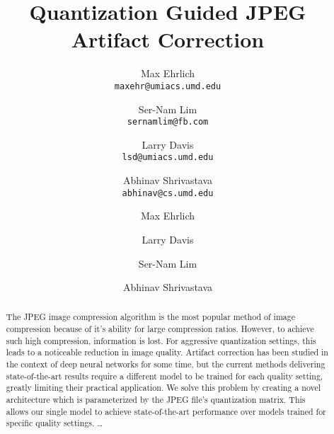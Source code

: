 \documentclass[runningheads]{llncs}
\begin{document}
\pagestyle{headings}
\mainmatter
\def\ECCVSubNumber{570}  

\title{Quantization Guided JPEG Artifact Correction}

\author{Max Ehrlich \\ \texttt{maxehr@umiacs.umd.edu} \and
    Ser-Nam Lim \\ \texttt{sernamlim@fb.com} \and
    Larry Davis \\ \texttt{lsd@umiacs.umd.edu} \and
    Abhinav Shrivastava \\ \texttt{abhinav@cs.umd.edu} 
}


\begin{comment}
\titlerunning{ECCV-20 submission ID \ECCVSubNumber} 
\authorrunning{ECCV-20 submission ID \ECCVSubNumber} 
\author{Anonymous ECCV submission}
\institute{Paper ID \ECCVSubNumber}
\end{comment}


\author{Max Ehrlich \and
Larry Davis \and
Ser-Nam Lim \and
Abhinav Shrivastava}

\maketitle

\begin{abstract}   
The JPEG image compression algorithm is the most popular method of image compression because of it’s ability for large compression ratios. However, to achieve such high compression, information is lost. For aggressive quantization settings, this leads to a noticeable reduction in image quality. Artifact correction has been studied in the context of deep neural networks for some time, but the current methods delivering state-of-the-art results require a different model to be trained for each quality setting, greatly limiting their practical application. We solve this problem by creating a novel architecture which is parameterized by the JPEG file’s quantization matrix. This allows our single model to achieve state-of-the-art performance over models trained for specific quality settings.
\dots
{}
\end{abstract} 
\end{document}
